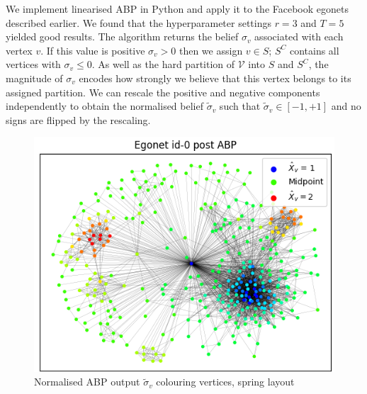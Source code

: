 \documentclass[]{article}
\newcommand{\Vcal}{\mathcal{V}}
\newcommand{\figwidth}{0.8\linewidth}
\begin{document}
\begin{multicols*}{2}
We implement linearised ABP in Python and apply it to the Facebook egonets described earlier. We found that the hyperparameter settings $r=3$ and $T=5$ yielded good results. The algorithm returns the belief $\sigma_v$ associated with each vertex $v$. If this value is positive $\sigma_v > 0$ then we assign $v \in S$; $S^C$ contains all vertices with $\sigma_v \leq 0$. As well as the hard partition of $\Vcal$ into $S$ and $S^C$, the magnitude of $\sigma_v$ encodes how strongly we believe that this vertex belongs to its assigned partition. We can rescale the positive and negative components independently to obtain the normalised belief $\tilde{\sigma}_v$ such that $\tilde{\sigma}_v \in [-1, +1]$ and no signs are flipped by the rescaling.
%
\begin{figure}[H]
	\centering
	\includegraphics[width=\figwidth]{ego-0-abp.png}
	\caption{Normalised ABP output $\tilde{\sigma}_v$ colouring vertices, spring layout}
	\label{fig:abp-output-norm}
\end{figure}


\end{multicols*}
\end{document}
